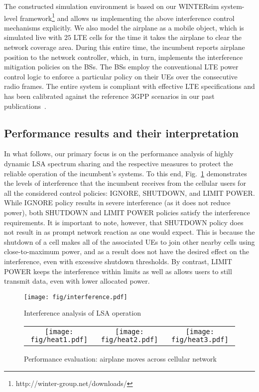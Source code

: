 \documentclass[journal]{IEEEtran}
\begin{document}
The constructed simulation environment is based on our WINTERsim system-level framework\footnote{http://winter-group.net/downloads/} and allows us implementing the above interference control mechanisms explicitly. We also model the airplane as a mobile object, which is simulated live with $25$ LTE cells for the time it takes the airplane to clear the network coverage area. During this entire time, the incumbent reports airplane position to the network controller, which, in turn, implements the interference mitigation policies on the BSs. The BSs employ the conventional LTE power control logic to enforce a particular policy on their UEs over the consecutive radio frames. The entire system is compliant with effective LTE specifications and has been calibrated against the reference 3GPP scenarios in our past publications~\cite{And14_2}.

\subsection{Performance results and their interpretation}

In what follows, our primary focus is on the performance analysis of highly dynamic LSA spectrum sharing and the respective measures to protect the reliable operation of the incumbent's systems. To this end, Fig.~\ref{fig:interference} demonstrates the levels of interference that the incumbent receives from the cellular users for all the considered control policies: IGNORE, SHUTDOWN, and LIMIT POWER. While IGNORE policy results in severe interference (as it does not reduce power), both SHUTDOWN and LIMIT POWER policies satisfy the interference requirements. It is important to note, however, that SHUTDOWN policy does not result in as prompt network reaction as one would expect. This is because the shutdown of a cell makes all of the associated UEs to join other nearby cells using close-to-maximum power, and as a result does not have the desired effect on the interference, even with excessive shutdown thresholds. By contrast, LIMIT POWER keeps the interference within limits as well as allows users to still transmit data, even with lower allocated power.

\begin{figure}[!ht]
\centering
\texttt{[image: fig/interference.pdf]}
\caption{Interference analysis of LSA operation}
\label{fig:interference}
\end{figure}

\begin{figure*}[!ht]
\begin{tabular}{ccc}
\texttt{[image: fig/heat1.pdf]} & \texttt{[image: fig/heat2.pdf]}  & \texttt{[image: fig/heat3.pdf]}\tabularnewline
\end{tabular}
\caption{Performance evaluation: airplane moves across cellular network}
\label{fig:plane}
\end{figure*}
\end{document}
